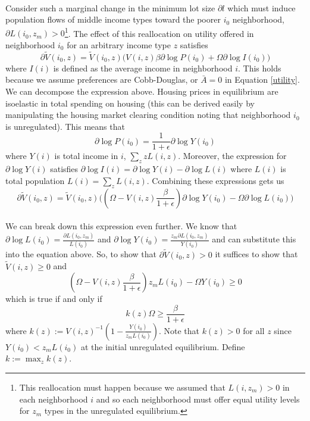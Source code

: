 \documentclass[11pt]{article}
\begin{document}
	\paragraph*{}
	 Consider such a marginal change in the minimum lot size $\partial l$ which must induce population flows of middle income types toward the poorer $i_{0}$ neighborhood, $\partial L(i_{0}, z_{m}) > 0$\footnote{This reallocation must happen because we assumed that $L(i, z_{m}) > 0$ in each neighborhood $i$ and so each neighborhood must offer equal utility levels for $z_{m}$ types in the unregulated equilibrium.}. The effect of this reallocation on utility offered in neighborhood $i_{0}$ for an arbitrary income type $z$ satisfies $$\partial \tilde{V}(i_{0}, z) = \tilde{V}(i_{0}, z)\bigg(V(i, z)\beta \partial \log P(i_{0}) + \Omega \partial \log I(i_{0}) \bigg)
	 $$
	where $I(i)$ is defined as the average income in neighborhood $i$. This holds because we assume preferences are Cobb-Douglas, or $\bar{A} = 0$ in Equation \eqref{utility}. We can decompose the expression above. Housing prices in equilibrium are isoelastic in total spending on housing (this can be derived easily by manipulating the housing market clearing condition noting that neighborhood $i_{0}$ is unregulated). This means that 
	$$\partial \log P(i_{0}) = \frac{1}{1 + \epsilon}\partial \log Y(i_{0})$$
	where $Y(i)$ is total income in $i$, $\sum_{z}zL(i, z)$. Moreover, the expression for $\partial \log Y(i)$ satisfies $\partial \log I(i) = \partial \log Y(i) - \partial \log L(i)$ where $L(i)$ is total population $L(i) = \sum_{z}L(i, z)$. Combining these expressions gets us $$\partial \tilde{V}(i_{0}, z) = \tilde{V}(i_{0}, z)\bigg( (\Omega - V(i, z)\frac{\beta}{1 + \epsilon}) \partial \log Y(i_{0}) - \Omega \partial \log L(i_{0})  \bigg)
	$$
	\paragraph*{}
	We can break down this expression even further. We know that $\partial \log L(i_{0}) = \frac{\partial L(i_{0}, z_{m})}{L(i_{0})}$ and $\partial \log Y(i_{0}) = \frac{z_{m}\partial L(i_{0}, z_{m})}{Y(i_{0})}$ and can substitute this into the equation above. So, to show that $\partial \tilde{V}(i_{0}, z) > 0$ it suffices to show that $\tilde{V}(i, z) \geq 0$ and $$(\Omega - V(i, z)\frac{\beta}{1 + \epsilon}) z_{m}L(i_{0}) - \Omega Y(i_{0}) \geq 0$$ 
	which is true if and only if $$k(z)\Omega \geq \frac{\beta}{1 + \epsilon}$$ where $k(z) := V(i, z)^{-1}(1 - \frac{Y(i_{0})}{z_{m}L(i_{0})})$. Note that $k(z) > 0$ for all $z$ since $Y(i_{0}) < z_{m}L(i_{0})$ at the initial unregulated equilibrium. Define $k := \max_{z}k(z)$. 
	
\end{document}
